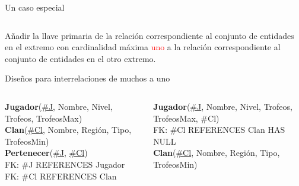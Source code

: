 \begin{frame}{Un caso especial}
\begin{columns}[T]
\begin{column}{0.50\linewidth}
\begin{scriptsize}
        
            \end{scriptsize}
        \end{column}
        
    \end{columns}
   
    \vspace{10mm}
    A\~nadir la llave primaria de la relaci\'on correspondiente al conjunto de entidades en el extremo con cardinalidad
            m\'axima \textcolor{red}{uno}
            a la relaci\'on correspondiente al conjunto de entidades en el otro extremo.
    

\end{frame}


\begin{frame}{Dise\~nos para interrelaciones de muchos a uno}
    \begin{columns}[T]
        \begin{column}{0.48\linewidth}
            \begin{scriptsize}
                \textbf{Jugador}(\underline{\#J}, Nombre, Nivel, Trofeos, TrofeosMax)\\[2mm]
                \textbf{Clan}(\underline{\#Cl}, Nombre, Regi\'on, Tipo, TrofeosMin)\\[2mm]
  
                \textbf{Pertenecer}(\underline{\#J}, \underline{\#Cl})\\[1mm]
                \hspace{4mm} FK: \#J REFERENCES Jugador\\
                \hspace{4mm} FK: \#Cl REFERENCES Clan
            \end{scriptsize}
        \end{column}

        \begin{column}{0.5\linewidth}
            \begin{scriptsize}
                \textbf{Jugador}(\underline{\#J}, Nombre, Nivel, Trofeos, TrofeosMax, \#Cl)\\[1mm]
                \hspace{4mm} FK: \#Cl REFERENCES Clan HAS NULL\\[2mm]
                \textbf{Clan}(\underline{\#Cl}, Nombre, Regi\'on, Tipo, TrofeosMin)\\[2mm]
            \end{scriptsize}
        \end{column}
        
    \end{columns}

    \vspace{5mm}


\end{frame}

